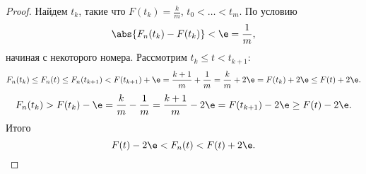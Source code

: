  \begin{proof}
     Найдем $t_k$, такие что $F(t_k) =\frac{k}{m}$, $t_0 < \ldots < t_m$.
     По условию 
     $$\abs{F_n(t_k) - F(t_k)} <  \e = \frac{1}{m},$$ начиная с некоторого номера.
     Рассмотрим $t_k\le t < t_{k + 1}$:
     $$F_n(t_k) \le F_n(t) \le F_n(t_{k+1}) < F(t_{k+1}) + \e = \frac{k+1}{m} + \frac{1}{m} = \frac{k}{m} + 2 \e = F(t_k) +2 \e \le F(t) + 2 \e.$$
     $$F_n(t_k) > F(t_k) - \e =\frac{k}{m} -\frac{1}{m} = \frac{k+1}{m} - 2 \e = F(t_{k +1}) - 2 \e \ge F(t) -2 \e.$$
     Итого 
     $$F(t) - 2 \e < F_n(t) < F(t) + 2 \e.$$
 \end{proof}


